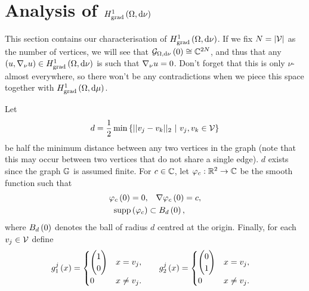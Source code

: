 \documentclass[11pt]{report}
\begin{document}
\section{Analysis of $H^1_\mathrm{grad}\left( \Omega, \mathrm{d}\nu \right)$} \label{sec:PointMassSpaceAnalysis}
This section contains our characterisation of $H^1_\mathrm{grad}\left( \Omega, \mathrm{d}\nu \right)$.
If we fix $N = \left\lvert \mathcal{V} \right\rvert$ as the number of vertices, we will see that $\mathcal{G}_{ \Omega, \mathrm{d}\nu}\left( 0 \right) \cong \mathbb{C}^{2N}$, and thus that any $\left( u,\nabla_{\nu}u \right)\in H^1_\mathrm{grad}\left( \Omega, \mathrm{d}\nu \right)$ is such that $\nabla_{\nu}u=0$.
Don't forget that this is only $\nu$-almost everywhere, so there won't be any contradictions when we piece this space together with $H^1_\mathrm{grad}\left( \Omega, \mathrm{d}\mu \right)$.

\begin{definition} \label{def:UsefulObjects}
	Let 
	\begin{align*}
		d=\recip{2}\min\clbracs{\norm{v_j-v_k}_2 \ \vert \ v_j,v_k\in\vertSet}
	\end{align*}
	be half the minimum distance between any two vertices in the graph (note that this may occur between two vertices that do not share a single edge).
	$d$ exists since the graph $\mathbb{G}$ is assumed finite.
	For $c\in\mathbb{C}$, let $\varphi_c:\mathbb{R}^2\rightarrow\mathbb{C}$ be the smooth function such that
	\begin{align*}
		\varphi_c\left( 0 \right) = 0, &\quad \nabla\varphi_c\left( 0 \right) = c, \\
		\mathrm{supp}\left( \varphi_c \right) &\subset B_{d}\left( 0 \right),
	\end{align*}
	where $B_{d}\left( 0 \right)$ denotes the ball of radius $d$ centred at the origin.
	Finally, for each $v_j\in\mathcal{V}$ define
	\begin{align*}
		g^j_1\left( x \right) &=
		\begin{cases}
			\begin{pmatrix} 1 \\ 0 \end{pmatrix} & x=v_j, \\
			0 & x\neq v_j. \\
		\end{cases}
		&\quad
		g^j_2\left( x \right) &=
		\begin{cases}
			\begin{pmatrix} 0 \\ 1 \end{pmatrix} & x=v_j, \\
			0 & x\neq v_j. \\
		\end{cases}
	\end{align*}
\end{definition}
\end{document}
